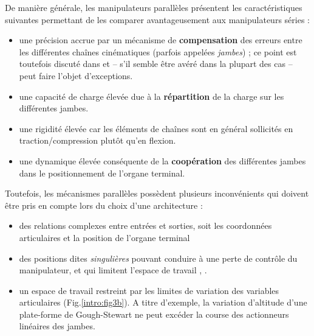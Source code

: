 De manière générale, les manipulateurs parallèles présentent les 
caractéristi\-ques sui\-vantes permettant de les comparer avantageusement aux 
manipulateurs séries :
\begin{itemize}
 \item une précision accrue par un mécanisme de {\bf compensation} des erreurs 
entre les différentes chaînes cinématiques (parfois appelées {\it jambes}) ; ce 
point est toutefois discut\'e dans \cite{briot2007}\cite{nzue2010} et -- s'il 
semble \^etre av\'er\'e dans la plupart des cas -- peut faire l'objet 
d'exceptions.
 \item une capacité de charge élevée due à la {\bf répartition} de la charge 
sur les différentes jambes.
 \item une rigidité élevée car les éléments de chaînes sont en g\'en\'eral 
sollicités en traction/compression plutôt qu'en flexion.
 \item une dynamique élevée conséquente de la {\bf coopération} des différentes 
jam\-bes dans le positionnement de l'organe terminal.
\end{itemize}

Toutefois, les mécanismes parallèles possèdent plusieurs inconvénients qui 
doivent être pris en compte lors du choix d'une architecture :
\begin{itemize}
 \item des relations complexes entre entrées et sorties, soit les coordonn\'ees 
articulaires et la position de l'organe terminal
 \item des positions dites {\it singulières} pouvant conduire à une perte de 
contrôle du manipulateur, et qui limitent l'espace de travail 
\cite{merlet89singular}, \cite{park1998}.
 \item un espace de travail restreint par les limites de variation des 
variables articulaires (Fig.\ref{intro:fig3b}). A titre d'exemple, la variation 
d'altitude d'une plate-forme de Gough-Stewart ne peut excéder la course des 
actionneurs linéaires des jambes.
\end{itemize}


